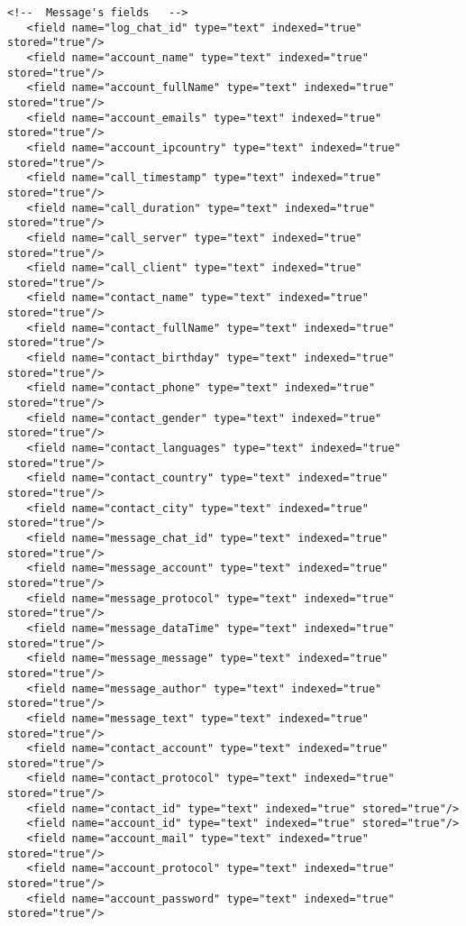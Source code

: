 \begin{lstlisting}
<!--  Message's fields   -->
   <field name="log_chat_id" type="text" indexed="true" stored="true"/>
   <field name="account_name" type="text" indexed="true" stored="true"/>
   <field name="account_fullName" type="text" indexed="true" stored="true"/>
   <field name="account_emails" type="text" indexed="true" stored="true"/>
   <field name="account_ipcountry" type="text" indexed="true" stored="true"/>
   <field name="call_timestamp" type="text" indexed="true" stored="true"/>
   <field name="call_duration" type="text" indexed="true" stored="true"/>
   <field name="call_server" type="text" indexed="true" stored="true"/>
   <field name="call_client" type="text" indexed="true" stored="true"/>
   <field name="contact_name" type="text" indexed="true" stored="true"/>
   <field name="contact_fullName" type="text" indexed="true" stored="true"/>
   <field name="contact_birthday" type="text" indexed="true" stored="true"/>
   <field name="contact_phone" type="text" indexed="true" stored="true"/>
   <field name="contact_gender" type="text" indexed="true" stored="true"/>
   <field name="contact_languages" type="text" indexed="true" stored="true"/>
   <field name="contact_country" type="text" indexed="true" stored="true"/>
   <field name="contact_city" type="text" indexed="true" stored="true"/>
   <field name="message_chat_id" type="text" indexed="true" stored="true"/>
   <field name="message_account" type="text" indexed="true" stored="true"/>
   <field name="message_protocol" type="text" indexed="true" stored="true"/>
   <field name="message_dataTime" type="text" indexed="true" stored="true"/>
   <field name="message_message" type="text" indexed="true" stored="true"/>
   <field name="message_author" type="text" indexed="true" stored="true"/>
   <field name="message_text" type="text" indexed="true" stored="true"/>
   <field name="contact_account" type="text" indexed="true" stored="true"/>
   <field name="contact_protocol" type="text" indexed="true" stored="true"/>
   <field name="contact_id" type="text" indexed="true" stored="true"/>
   <field name="account_id" type="text" indexed="true" stored="true"/>
   <field name="account_mail" type="text" indexed="true" stored="true"/>
   <field name="account_protocol" type="text" indexed="true" stored="true"/>
   <field name="account_password" type="text" indexed="true" stored="true"/>
\end{lstlisting}



